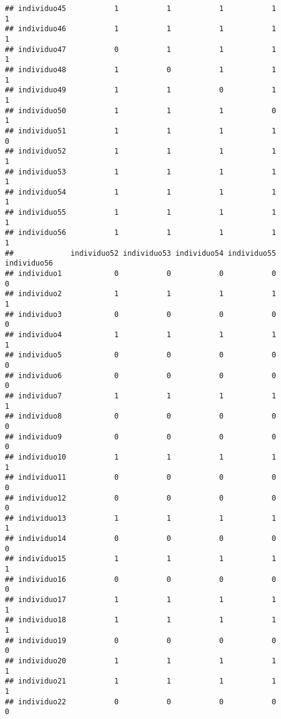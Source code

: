\documentclass[
]{article}
\begin{document}
\begin{verbatim}
## individuo45           1           1           1           1           1
## individuo46           1           1           1           1           1
## individuo47           0           1           1           1           1
## individuo48           1           0           1           1           1
## individuo49           1           1           0           1           1
## individuo50           1           1           1           0           1
## individuo51           1           1           1           1           0
## individuo52           1           1           1           1           1
## individuo53           1           1           1           1           1
## individuo54           1           1           1           1           1
## individuo55           1           1           1           1           1
## individuo56           1           1           1           1           1
##             individuo52 individuo53 individuo54 individuo55 individuo56
## individuo1            0           0           0           0           0
## individuo2            1           1           1           1           1
## individuo3            0           0           0           0           0
## individuo4            1           1           1           1           1
## individuo5            0           0           0           0           0
## individuo6            0           0           0           0           0
## individuo7            1           1           1           1           1
## individuo8            0           0           0           0           0
## individuo9            0           0           0           0           0
## individuo10           1           1           1           1           1
## individuo11           0           0           0           0           0
## individuo12           0           0           0           0           0
## individuo13           1           1           1           1           1
## individuo14           0           0           0           0           0
## individuo15           1           1           1           1           1
## individuo16           0           0           0           0           0
## individuo17           1           1           1           1           1
## individuo18           1           1           1           1           1
## individuo19           0           0           0           0           0
## individuo20           1           1           1           1           1
## individuo21           1           1           1           1           1
## individuo22           0           0           0           0           0

\end{verbatim}
\end{document}

